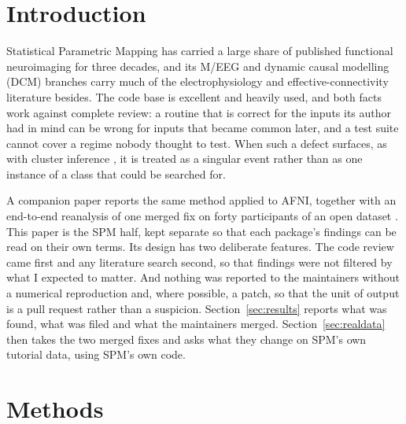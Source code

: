 \documentclass[11pt]{article}
\begin{document}
\begin{abstract}
error-related negativity, and the group ERN was $-10.4$\,$\mu$V before the fix against $-8.3$\,$\mu$V after (paired $p = 0.003$, $n = 30$); on stimulus-locked epochs with a 200\,ms baseline, and under robust averaging in either design, the change was small. The reviews, harnesses, patches, pipeline and results are public.
\end{abstract}

\section{Introduction}
Statistical Parametric Mapping \cite{friston2007} has carried a large share of published functional neuroimaging for three decades, and its M/EEG and dynamic causal modelling (DCM) branches carry much of the electrophysiology and effective-connectivity literature besides. The code base is excellent and heavily used, and both facts work against complete review: a routine that is correct for the inputs its author had in mind can be wrong for inputs that became common later, and a test suite cannot cover a regime nobody thought to test. When such a defect surfaces, as with cluster inference \cite{eklund2016}, it is treated as a singular event rather than as one instance of a class that could be searched for.

A companion paper reports the same method applied to AFNI, together with an end-to-end reanalysis of one merged fix on forty participants of an open dataset \cite{condra2026}. This paper is the SPM half, kept separate so that each package's findings can be read on their own terms. Its design has two deliberate features. The code review came first and any literature search second, so that findings were not filtered by what I expected to matter. And nothing was reported to the maintainers without a numerical reproduction and, where possible, a patch, so that the unit of output is a pull request rather than a suspicion. Section~\ref{sec:results} reports what was found, what was filed and what the maintainers merged. Section~\ref{sec:realdata} then takes the two merged fixes and asks what they change on SPM's own tutorial data, using SPM's own code.

\section{Methods}
\end{document}
